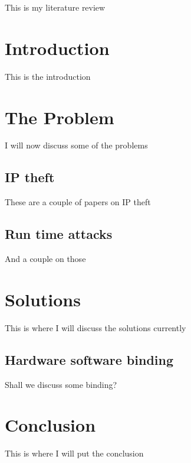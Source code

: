 This is my literature review

\section{Introduction}

This is the introduction

\section{The Problem}

I will now discuss some of the problems

\subsection{IP theft}

These are a couple of papers on IP theft

\subsection{Run time attacks}

And a couple on those

\section{Solutions}

This is where I will discuss the solutions currently

\subsection{Hardware software binding}

Shall we discuss some binding?

\section{Conclusion}

This is where I will put the conclusion